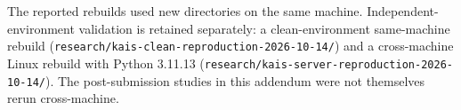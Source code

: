 \documentclass[10pt,a4paper]{article}
\begin{document}
The reported rebuilds used new directories on the same machine. Independent-environment validation is retained separately: a clean-environment same-machine rebuild (\nolinkurl{research/kais-clean-reproduction-2026-10-14/}) and a cross-machine Linux rebuild with Python 3.11.13 (\nolinkurl{research/kais-server-reproduction-2026-10-14/}). The post-submission studies in this addendum were not themselves rerun cross-machine.
\end{document}
